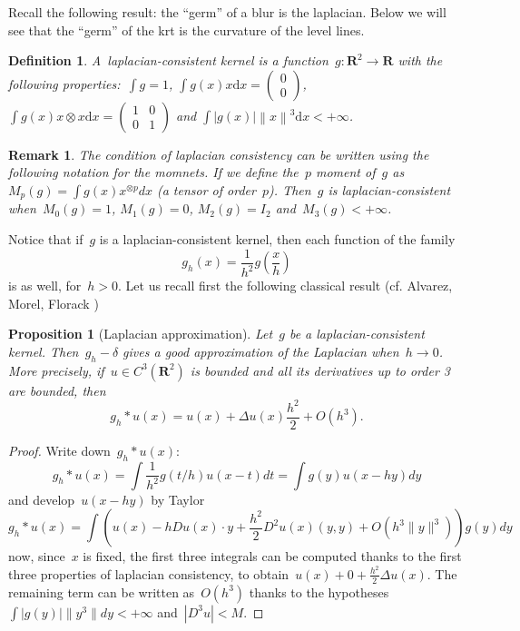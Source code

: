\documentclass[12pt]{article}                  %
\newtheorem{remark}{Remark}
\newtheorem{definition}{Definition}
\newtheorem{proposition}{Proposition}
\begin{document}
Recall the following result: the ``germ'' of a blur is the laplacian.  Below
we will see that the ``germ'' of the krt is the curvature of the level
lines.

\begin{definition}
	A~\emph{laplacian-consistent kernel} is a
	function~$g:\mathbf{R}^2\to\mathbf{R}$ with the following
	properties:~$\int g=1$, $\int g(x)x\mathrm{d} x=
	\left(\begin{smallmatrix}0\\0\end{smallmatrix}\right) $,
	$\int g(x)x\otimes x\mathrm{d}
	x=\left(\begin{smallmatrix}1&0\\0&1\end{smallmatrix}\right)$ and
	$\int \left|g(x)\right|\left\|x\right\|^3\mathrm{d} x<+\infty$.
\end{definition}

\begin{remark}
	The condition of laplacian consistency can be written using the following
	notation for the momnets.  If we define the~$p$ moment of~$g$
	as~$M_p(g)=\int g(x)x^{\otimes p}dx$ (a tensor of order~$p$).  Then~$g$ is
	laplacian-consistent when~$M_0(g)=1$, $M_1(g)=0$, $M_2(g)=I_2$
	and~$M_3(g)<+\infty$.
\end{remark}

Notice that if~$g$ is a laplacian-consistent kernel, then each function of
the family
\[
	g_h(x)=\frac1{h^2}g\left(\frac{x}{h}\right)
\]
is as well, for~$h>0$.  Let us recall first the following classical result (cf. 
Alvarez, Morel, Florack )

\begin{proposition}[Laplacian approximation]
	Let~$g$ be a laplacian-consistent kernel.
	Then~$g_h-\delta$ gives a good approximation of the
	Laplacian when~$h\to 0$.  More precisely, if~$u\in C^3(\mathbf{R}^2)$
	is bounded and all its derivatives up to order 3 are bounded,
	then
	\[
		g_h*u(x)=u(x)+\Delta u(x) \frac{h^2}{2} + O(h^3).
	\]
\end{proposition}
\begin{proof}
	Write down~$g_h*u(x)$:
	\[
		g_h*u(x)
		=\int \frac1{h^2}g(t/h)u(x-t)d t
		=\int g(y)u(x-hy)d y
	\]
	and develop~$u(x-hy)$ by
	Taylor
	\[
		g_h*u(x)
		=
		\int
		\left(
		u(x)
		-hDu(x)\cdot y
		+\frac{h^2}2D^2u(x)(y,y)
		+O(h^3\|y\|^3)
		\right)
		g(y)
		dy
	\]
	now, since~$x$ is fixed, the first three integrals can be computed thanks
	to the first three properties of laplacian consistency, to
	obtain~$u(x)+0+\frac{h^2}2\Delta u(x)$.  The remaining term can be
	written as~$O(h^3)$ thanks to the hypotheses $\int|g(y)|\|y^3\|dy<+\infty$
	and~$|D^3u|<M$.
\end{proof}
\end{document}
